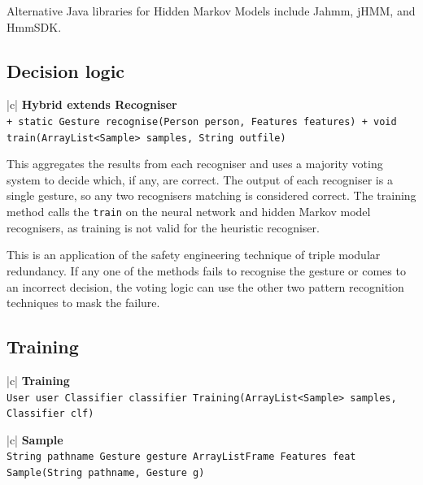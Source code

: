\documentclass[12pt,a4,notitlepage]{report}
\renewcommand{\_}{\texttt{\symbol{95}}}
\newcommand{\<}{\texttt{\symbol{60}}}
\renewcommand{\>}{\texttt{\symbol{62}}}
\newcommand{\class}[1]{\textbf{#1}}
\newcommand{\variable}[1]{\texttt{#1}}
\begin{document}
{Alternative Java libraries for Hidden Markov Models include Jahmm, jHMM, and HmmSDK.

\newpage

\subsection{Decision logic}

\begin{tabular}{|c|} \hline 
\class{Hybrid extends Recogniser} \\ \hline
{}
{ \variable{+ static Gesture recognise(Person person, Features features) \newline
+ void train(ArrayList<Sample> samples, String out\_file)
} } \\ \hline
\end{tabular}

This aggregates the results from each recogniser and uses a majority voting system to decide which, if any, are correct. The output of each recogniser is a single gesture, so any two recognisers matching is considered correct. The training method calls the \variable{train} on the neural network and hidden Markov model recognisers, as training is not valid for the heuristic recogniser.

This is an application of the safety engineering technique of triple modular redundancy. If any one of the methods fails to recognise the gesture or comes to an incorrect decision, the voting logic can use the other two pattern recognition techniques to mask the failure.

\subsection{Training}

\begin{tabular}{|c|} \hline 
\class{Training} \\ \hline
{}
{\variable{User user \newline
Classifier classifier \newline
Training(ArrayList<Sample> samples, Classifier clf)
} } \\ \hline
\end{tabular}

\begin{tabular}{|c|} \hline 
\class{Sample} \\ \hline
{}
{\variable{String pathname \newline
Gesture gesture \newline
ArrayList\<Frame\> \newline
Features feat \newline
Sample(String pathname, Gesture g)
} } \\ \hline
\end{tabular}

}
\end{document}
